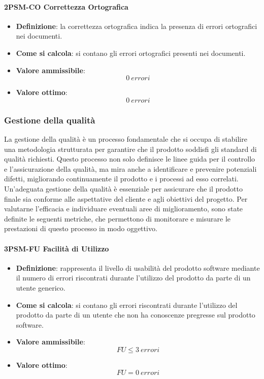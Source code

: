 \paragraph*{2PSM-CO Correttezza Ortografica}
\begin{itemize}
	\item \textbf{Definizione}: la correttezza ortografica indica la presenza di errori ortografici nei documenti.
	\item \textbf{Come si calcola}: si contano gli errori ortografici presenti nei documenti.
	\item \textbf{Valore ammissibile}: \begin{equation*}0\ errori\end{equation*}
	\item \textbf{Valore ottimo}: \begin{equation*}0\ errori\end{equation*}
\end{itemize}



\subsubsection{Gestione della qualità}
La gestione della qualità è un processo fondamentale che si occupa di stabilire una metodologia strutturata 
per garantire che il prodotto soddisfi gli standard di qualità richiesti. 
Questo processo non solo definisce le linee guida per il controllo e l’assicurazione della qualità, 
ma mira anche a identificare e prevenire potenziali difetti, migliorando continuamente il prodotto e i processi ad esso correlati.
Un’adeguata gestione della qualità è essenziale per assicurare che il prodotto finale sia conforme 
alle aspettative del cliente e agli obiettivi del progetto. Per valutarne l’efficacia e individuare 
eventuali aree di miglioramento, sono state definite le seguenti metriche, che permettono di monitorare 
e misurare le prestazioni di questo processo in modo oggettivo.

\paragraph*{3PSM-FU Facilità di Utilizzo}
\begin{itemize}
	\item \textbf{Definizione}: rappresenta il livello di usabilità del prodotto software mediante il numero di errori riscontrati durante l'utilizzo del prodotto da parte di un utente generico.
	\item \textbf{Come si calcola}: si contano gli errori riscontrati durante l'utilizzo del prodotto da parte di un utente che non ha conoscenze pregresse sul prodotto software.
	\item \textbf{Valore ammissibile}: \begin{equation*}FU \leq 3\ errori\end{equation*}
	\item \textbf{Valore ottimo}: \begin{equation*}FU = 0\ errori\end{equation*}
\end{itemize}

